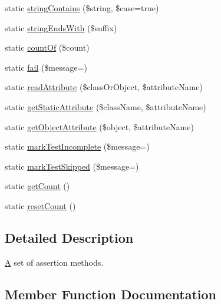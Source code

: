 \begin{DoxyCompactItemize}
\item 
static \mbox{\hyperlink{class_p_h_p_unit___framework___assert_a743d48f0997da495f42c9e4df64db31f}{string\+Contains}} (\$string, \$case=true)
\item 
static \mbox{\hyperlink{class_p_h_p_unit___framework___assert_a19037a12aae07b5e194de718ecedec0b}{string\+Ends\+With}} (\$suffix)
\item 
static \mbox{\hyperlink{class_p_h_p_unit___framework___assert_acb4d3e3212f0877aaa5366d381ac3d92}{count\+Of}} (\$count)
\item 
static \mbox{\hyperlink{class_p_h_p_unit___framework___assert_a77a78d191447c4b7803ded846554279b}{fail}} (\$message=\textquotesingle{}\textquotesingle{})
\item 
static \mbox{\hyperlink{class_p_h_p_unit___framework___assert_abe109d13ee5ea79ded6ddd4942764cb3}{read\+Attribute}} (\$class\+Or\+Object, \$attribute\+Name)
\item 
static \mbox{\hyperlink{class_p_h_p_unit___framework___assert_aefdd75250f4facef97e1b2174056bd91}{get\+Static\+Attribute}} (\$class\+Name, \$attribute\+Name)
\item 
static \mbox{\hyperlink{class_p_h_p_unit___framework___assert_aeaef8625b544654f29ec1c8f03027a70}{get\+Object\+Attribute}} (\$object, \$attribute\+Name)
\item 
static \mbox{\hyperlink{class_p_h_p_unit___framework___assert_ad7ee58b22c15c758237dcccae4a8c1c4}{mark\+Test\+Incomplete}} (\$message=\textquotesingle{}\textquotesingle{})
\item 
static \mbox{\hyperlink{class_p_h_p_unit___framework___assert_a66072a84ab190a379766f3c2b9239bb4}{mark\+Test\+Skipped}} (\$message=\textquotesingle{}\textquotesingle{})
\item 
static \mbox{\hyperlink{class_p_h_p_unit___framework___assert_a9f70d3865f00e8c356111d4e246bb50d}{get\+Count}} ()
\item 
static \mbox{\hyperlink{class_p_h_p_unit___framework___assert_a56100b6464827054cd04d4004eae393c}{reset\+Count}} ()
\end{DoxyCompactItemize}


\subsection{Detailed Description}
\mbox{\hyperlink{class_a}{A}} set of assertion methods. 

\subsection{Member Function Documentation}
\mbox{\label{class_p_h_p_unit___framework___assert_add735b7ec3aa72ba4f692c82df884ed1}} 
